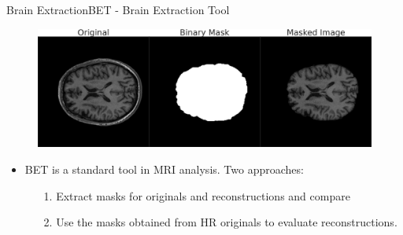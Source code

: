 \documentclass[10pt, unicode]{beamer}
\begin{document}
\begin{frame}{Brain Extraction}{BET - Brain Extraction Tool}

  \begin{figure}
    \includegraphics[scale=0.2]{./images/mask_example.png}
  \end{figure}
  
  \begin{itemize}
    \item BET is a standard tool in MRI analysis. Two approaches:
    \begin{itemize}
      \item [1.] Extract masks for originals and reconstructions and compare
      \item [2.] Use the masks obtained from HR originals to evaluate 
                 reconstructions.
    \end{itemize}
  
  \end{itemize}

\end{frame}
\end{document}
